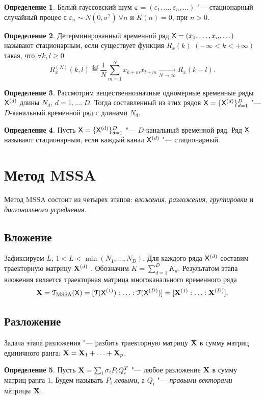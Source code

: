 \documentclass[specialist,
substylefile = spbu_report.rtx,
subf,href,colorlinks=true, 12pt]{disser}
\theoremstyle{definition}
\newtheorem{definition}{Определение}
\begin{document}
\begin{definition}
	Белый гауссовский шум $\boldsymbol{\varepsilon}=(\varepsilon_1,\ldots,\varepsilon_n,\ldots)$ "--- стационарный случайный процес с $\varepsilon_n\sim N(0, \sigma^2)~\forall n$ и $\widetilde K(n)=0$, при $n>0$.
\end{definition}
\begin{definition}
	Детерминированный временной ряд $\mathsf{X}=(x_1,\ldots,x_n,\ldots)$ называют стационарным, если существует функция $R_x(k)$ $(-\infty<k<+\infty)$ такая, что $\forall k,l\geqslant0$
	\begin{equation*}
		R_x^{(N)}(k,l)\overset{\text{def}}{=}\frac{1}{N}\sum_{m=1}^Nx_{k+m}x_{l+m}\underset{N\to\infty}\longrightarrow R_x(k - l).
	\end{equation*}
\end{definition}
\begin{definition}
	Рассмотрим вещественнозначные одномерные временные ряды $\mathsf{X}^{(d)}$ длины $N_d$, $d=1,\ldots,D$. Тогда составленный из этих рядов $\mathsf{X}=\{\mathsf{X}^{(d)}\}_{d=1}^D$ "--- $D$-канальный временной ряд с длинами $N_d$.
\end{definition}
\begin{definition}
	Пусть $\mathsf{X}=\{\mathsf{X}^{(d)}\}_{d=1}^D$ "--- $D$-канальный временной ряд. Ряд $\mathsf{X}$ называют стационарным, если каждый канал $\mathsf{X}^{(d)}$ "--- стационарный.
\end{definition}

\section{Метод MSSA}\label{sect:mssa}
Метод MSSA состоит из четырех этапов: \emph{вложения}, \emph{разложения}, \emph{группировки} и \emph{диагонального усреднения}.

\subsection{Вложение}\label{sect:embedding}
Зафиксируем $L$, $1<L<\min(N_1,\ldots,N_D)$. Для каждого ряда $\mathsf{X}^{(d)}$ составим траекторную матрицу $\mathbf{X}^{(d)}$ . Обозначим $K=\sum_{d=1}^D K_d$. Результатом этапа вложения является траекторная матрица многоканального временного ряда
\begin{equation}\label{eq:embedding_mssa}
	\mathbf{X}=\EuScript{T}_{\text{MSSA}}(\mathsf{X})=[\EuScript{T}(\mathsf{X}^{(1)}):\ldots:\EuScript{T}(\mathsf{X}^{(D)})]=[\mathbf{X}^{(1)}:\ldots:\mathbf{X}^{(D)}].
\end{equation}
\subsection{Разложение}
Задача этапа разложения "--- разбить траекторную матрицу $\mathbf{X}$ в сумму матриц единичного ранга: $\mathbf{X}=\mathbf{X}_1+\ldots+\mathbf{X}_p$.
\begin{definition}
	Пусть $\mathbf{X}=\sum_i \sigma_i P_i Q_i^T$ "--- любое разложение $\mathbf{X}$ в сумму матриц ранга $1$. Будем называть $P_i$ \emph{левыми}, а $Q_i$ "--- \emph{правыми векторами} матрицы $\mathbf{X}$.
\end{definition}
\end{document}
